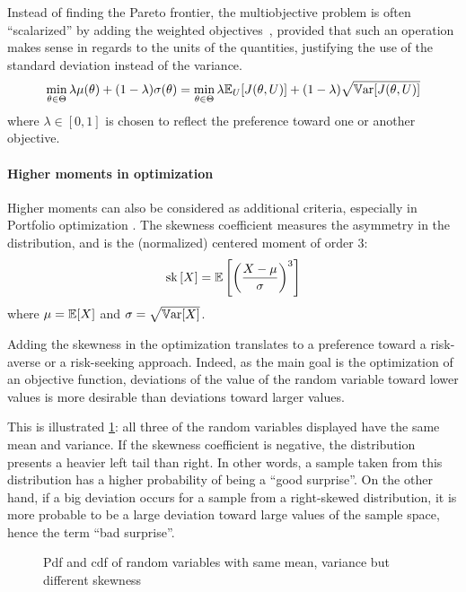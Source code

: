 \documentclass[../../Main_ManuscritThese.tex]{subfiles}
\newcommand\imgpath{/home/victor/acadwriting/Manuscrit/Text/Chapter3/img/}
\begin{document}
Instead of finding the Pareto frontier, the multiobjective problem is often ``scalarized'' by adding the weighted objectives~\cite{marler_weighted_2010}, provided that such an operation makes sense in regards to the units of the quantities, justifying the use of the standard deviation instead of the variance.
\begin{equation}
  \min_{\theta\in\Theta} \lambda \mu(\theta) + (1- \lambda)\sigma(\theta) =   \min_{\theta\in\Theta} \lambda \mathbb{E}_{U}[J(\theta,U)] + (1- \lambda)\sqrt{\mathbb{V}\mathrm{ar}[J(\theta,U)]}
\end{equation}
where $\lambda \in [0,1]$ is chosen to reflect the preference toward one or another objective.

\paragraph{Higher moments in optimization}
\label{sec:higher_moments}
Higher moments can also be considered as additional criteria, especially in Portfolio optimization \cite{lai_mean-variance-skewness-kurtosis-based_2006,briec_mean-variance-skewness_2007}. 
The skewness coefficient measures the asymmetry in the distribution, and is the (normalized) centered moment of order $3$:
\begin{equation}
  \mathrm{sk}\left[X\right] = \mathbb{E}\left[\left(\frac{X - \mu}{\sigma}\right)^3\right]
\end{equation}
where $\mu = \mathbb{E}[X]$ and $\sigma = \sqrt{\mathbb{V}\mathrm{ar}[X]}$.

Adding the skewness in the optimization translates to a preference toward a risk-averse or a risk-seeking approach. Indeed, as the main goal is the optimization of an objective function, deviations of the value of the random variable toward lower values is more desirable than deviations toward larger values.

This is illustrated \cref{fig:skewness_example}: all three of the random variables displayed have the same mean and variance.
If the skewness coefficient is negative, the distribution presents a heavier left tail than right. In other words, a sample taken from this distribution has a higher probability of being a ``good surprise''. On the other hand, if a big deviation occurs for a sample from a right-skewed distribution, it is more probable to be a large deviation toward large values of the sample space, hence the term ``bad surprise''.

\begin{figure}[ht]
  \centering
  
  \caption[Influence of the skewness]{\label{fig:skewness_example} Pdf and cdf of random variables with same mean, variance but different skewness}
\end{figure}
\end{document}
